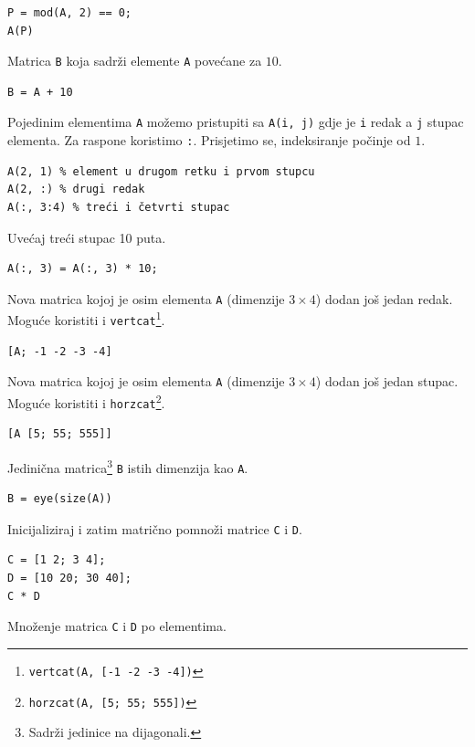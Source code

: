 \documentclass[a4paper, 10pt]{article}
\newcommand{\spec}[1]{\texttt{#1}} %
\begin{document}
\begin{lstlisting}
P = mod(A, 2) == 0;
A(P)
\end{lstlisting}

Matrica \spec{B} koja sadrži elemente \spec{A} povećane za $10$.

\begin{lstlisting}
B = A + 10
\end{lstlisting}

Pojedinim elementima \spec{A} možemo pristupiti sa \spec{A(i, j)} gdje je \spec{i} redak a \spec{j} stupac elementa.
Za raspone koristimo \spec{:}.
Prisjetimo se, indeksiranje počinje od $1$.

\begin{lstlisting}
A(2, 1) % element u drugom retku i prvom stupcu
A(2, :) % drugi redak
A(:, 3:4) % treći i četvrti stupac
\end{lstlisting}

Uvećaj treći stupac 10 puta.

\begin{lstlisting}
A(:, 3) = A(:, 3) * 10;
\end{lstlisting}

Nova matrica kojoj je osim elementa \spec{A} (dimenzije $3 \times 4$) dodan još jedan redak.
Moguće koristiti i \spec{vertcat}\footnote{\spec{vertcat(A, [-1 -2 -3 -4])}}.

\begin{lstlisting}
[A; -1 -2 -3 -4]
\end{lstlisting}

Nova matrica kojoj je osim elementa \spec{A} (dimenzije $3 \times 4$) dodan još jedan stupac.
Moguće koristiti i \spec{horzcat}\footnote{\spec{horzcat(A, [5; 55; 555])}}.

\begin{lstlisting}
[A [5; 55; 555]]
\end{lstlisting}

Jedinična matrica\footnote{Sadrži jedinice na dijagonali.} \spec{B} istih dimenzija kao \spec{A}.

\begin{lstlisting}
B = eye(size(A))
\end{lstlisting}

Inicijaliziraj i zatim matrično pomnoži matrice \spec{C} i \spec{D}.

\begin{lstlisting}
C = [1 2; 3 4];
D = [10 20; 30 40];
C * D
\end{lstlisting}

Množenje matrica \spec{C} i \spec{D} po elementima.
\end{document}

